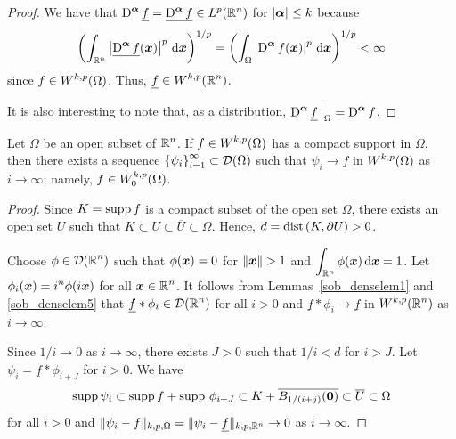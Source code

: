 \begin{proof}
 We have that $\displaystyle \operatorname{D}^{{\bm{\alpha}}} \underline{f}
= \underline{\operatorname{D}^{{\bm{\alpha}}} f} \in L^p(\mathbb{R}^n)$ for
$|{\bm{\alpha}}|\leq k$ because 
\[
\left( \int_{\mathbb{R}^n} \left|\underline{\operatorname{D}^{{\bm{\alpha}}} f}({\bm{x}})\right|^p
\,\mathrm{d}{{\bm{x}}}\right)^{1/p} = 
\left( \int_{\Omega} \left| \operatorname{D}^{{\bm{\alpha}}} f({\bm{x}}) \right|^p
\,\mathrm{d}{{\bm{x}}}\right)^{1/p} < \infty
\]
since $\displaystyle f \in W^{k,p}(\Omega)$.  Thus,
$\displaystyle \underline{f} \in W^{k,p}(\mathbb{R}^n)$.

It is also interesting to note that, as a distribution,
$\displaystyle \operatorname{D}^{{\bm{\alpha}}} \underline{f}\,\big|_{\Omega}
= \operatorname{D}^{{\bm{\alpha}}} f$.
\end{proof}

\begin{lemma} \label{sob_w0_trad1}
Let $\Omega$ be an open subset of $\displaystyle \mathbb{R}^n$.
If $\displaystyle f \in W^{k,p}(\Omega)$ has a compact support in
$\Omega$, then there exists a sequence
$\displaystyle \left\{ \psi_i \right\}_{i=1}^\infty \subset \mathcal{D}(\Omega)$
such that $\psi_i \to f$ in $\displaystyle W^{k,p}(\Omega)$ as
$i \to \infty$; namely, $\displaystyle f\in W^{k,p}_0(\Omega)$.
\end{lemma}

\begin{proof}
Since $K = \operatorname{supp} f$ is a compact subset of the open set $\Omega$,
there exists an open set $U$ such that
$K \subset U \subset \overline{U} \subset \Omega$.  Hence,
$\displaystyle d = \mathrm{dist}\left(K,\partial U\right) > 0$. 

Choose $\displaystyle \phi \in \mathcal{D}(\mathbb{R}^n)$ such that
$\phi({\bm{x}}) = 0$ for $\|\VEC{x}\|>1$ and
$\displaystyle \int_{\mathbb{R}^n} \phi({\bm{x}}) \,\mathrm{d}{{\bm{x}}} = 1$.
Let $\displaystyle \phi_i({\bm{x}}) = i^n\phi(i {\bm{x}})$ for all
$\displaystyle {\bm{x}} \in \mathbb{R}^n$.
It follows from Lemmas~\ref{sob_denselem1} and
\ref{sob_denselem5} that 
$\displaystyle \underline{f} \ast \phi_i \in \mathcal{D}(\mathbb{R}^n)$ for all $i>0$
and
$\underline{f} \ast \phi_i \to \underline{f}$ in
$\displaystyle W^{k,p}(\mathbb{R}^n)$ as $i \to \infty$.

Since $1/i \to 0$ as $i\to \infty$, there exists $J>0$ such that $1/i<d$
for $i > J$.  Let $\psi_i = \underline{f} \ast \phi_{i+J}$ for $i>0$.
We have
\[
  \operatorname{supp} \psi_i \subset \operatorname{supp} f + \operatorname{supp}\, \phi_{i+J}
  \subset K + \overline{B_{1/(i+j)}({\bm{0}})}
  \subset \overline{U} \subset \Omega
\]
for all $i >0$ and
$\displaystyle \| \psi_i - f \|_{k,p,\Omega}
= \| \psi_i - \underline{f} \|_{k,p,\mathbb{R}^n} \to 0$
as $i \to \infty$.
\end{proof}


